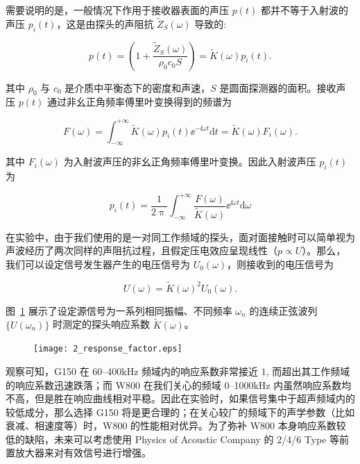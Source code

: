 
需要说明的是，一般情况下作用于接收器表面的声压 $p(t)$ 都并不等于入射波的声压 $p_{i}(t)$，这是由探头的声阻抗 $\widetilde{Z}_{S}(\omega)$ 导致的:

\begin{equation}
  p(t) = \left(1 + \frac{\widetilde{Z}_{S}(\omega)}{\rho_{0}c_{0}S}\right) =\widetilde{K}(\omega)p_{i}(t).
\end{equation}

其中 $\rho_{0}$ 与 $c_{0}$ 是介质中平衡态下的密度和声速，$S$ 是圆面探测器的面积。接收声压 $p(t)$ 通过非幺正角频率傅里叶变换得到的频谱为

\begin{equation}
  F(\omega) = \int_{-\infty}^{+\infty}\widetilde{K}(\omega)p_{i}(t){\ee}^{-\ii\omega t}\mathrm{d}t = \widetilde{K}(\omega)F_{i}(\omega).
\end{equation}

其中 $F_{i}(\omega)$ 为入射波声压的非幺正角频率傅里叶变换。因此入射波声压 $p_{i}(t)$ 为

\begin{equation}
  p_{i}(t) = \frac{1}{2\uppi}\int_{-\infty}^{+\infty}\frac{F(\omega)}{\widetilde{K}(\omega)}{\ee}^{\ii\omega t}\mathrm{d}\omega\label{eq:response_correct}
\end{equation}

在实验中，由于我们使用的是一对同工作频域的探头，面对面接触时可以简单视为声波经历了两次同样的声阻抗过程，且假定压电效应呈现线性（$p\propto U$）。那么，我们可以设定信号发生器产生的电压信号为 $U_{0}(\omega)$，则接收到的电压信号为

\begin{equation}
  U(\omega) = \widetilde{K}(\omega)^{2}U_{0}(\omega).
\end{equation}

图~\ref{fig:response_factor} 展示了设定源信号为一系列相同振幅、不同频率 $\omega_{n}$ 的连续正弦波列 $\{U(\omega_{n})\}$ 时测定的探头响应系数 $\widetilde{K}(\omega)$。

\begin{figure}[!htp]
  \centering
  \texttt{[image: 2\_response\_factor.eps]}
  \label{fig:response_factor}
\end{figure}

观察可知，G150 在 \numrange{60}{400}\unit{\kilo\hertz} 频域内的响应系数非常接近 $1$, 而超出其工作频域的响应系数迅速跌落；而 W800 在我们关心的频域 \numrange{0}{1000}\unit{\kilo\hertz} 内虽然响应系数均不高，但是胜在响应曲线相对平稳。因此在实验时，如果信号集中于超声频域内的较低成分，那么选择 G150 将是更合理的；在关心较广的频域下的声学参数（比如衰减、相速度等）时，W800 的性能相对优异。为了弥补 W800 本身响应系数较低的缺陷，未来可以考虑使用 Physics of Acoustic Company 的 2/4/6 Type 等前置放大器来对有效信号进行增强。

